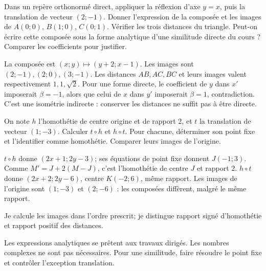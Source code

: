 \label{t11s-c15-p01}
Dans un repère orthonormé direct, appliquer la réflexion d’axe $y=x$, puis la translation de vecteur $(2;-1)$. Donner l’expression de la composée et les images de $A(0;0)$, $B(1;0)$, $C(0;1)$. Vérifier les trois distances du triangle. Peut-on écrire cette composée sous la forme analytique d’une similitude directe du cours ? Comparer les coefficients pour justifier.
\begin{corrige}\label{sol-t11s-c15-p01}
La composée est $(x;y)\mapsto(y+2;x-1)$. Les images sont $(2;-1),(2;0),(3;-1)$. Les distances $AB,AC,BC$ et leurs images valent respectivement $1,1,\sqrt2$. Pour une forme directe, le coefficient de $y$ dans $x'$ imposerait $\beta=-1$, alors que celui de $x$ dans $y'$ imposerait $\beta=1$, contradiction. C’est une isométrie indirecte : conserver les distances ne suffit pas à être directe.
\end{corrige}
\label{t11s-c15-p02}
On note $h$ l’homothétie de centre origine et de rapport $2$, et $t$ la translation de vecteur $(1;-3)$. Calculer $t\circ h$ et $h\circ t$. Pour chacune, déterminer son point fixe et l’identifier comme homothétie. Comparer leurs images de l’origine.
\begin{corrige}\label{sol-t11s-c15-p02}
$t\circ h$ donne $(2x+1;2y-3)$; ses équations de point fixe donnent $J(-1;3)$. Comme $M'=J+2(M-J)$, c’est l’homothétie de centre $J$ et rapport $2$. $h\circ t$ donne $(2x+2;2y-6)$, centre $K(-2;6)$, même rapport. Les images de l’origine sont $(1;-3)$ et $(2;-6)$ : les composées diffèrent, malgré le même rapport.
\end{corrige}

\begin{jemeteste}Je calcule les images dans l’ordre prescrit; je distingue rapport signé d’homothétie et rapport positif des distances.\end{jemeteste}
\begin{notepourlaclasse}Les expressions analytiques se prêtent aux travaux dirigés. Les nombres complexes ne sont pas nécessaires. Pour une similitude, faire résoudre le point fixe et contrôler l’exception translation.\end{notepourlaclasse}
